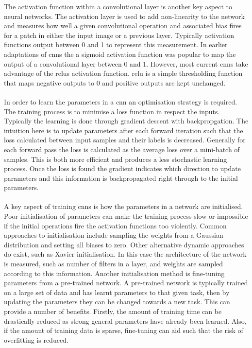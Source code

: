 The activation function within a convolutional layer is another key aspect to neural networks. The activation layer is used to add non-linearity to the network and measures how well a given convolutional operation and associated bias fires for a patch in either the input image or a previous layer. Typically activation functions output between 0 and 1 to represent this measurement. In earlier adaptations of \glspl{cnn} the a sigmoid activation function was popular to map the output of a convolutional layer between 0 and 1. However, most current \glspl{cnn} take advantage of the \glspl{relu} activation function. \gls{relu} is a simple thresholding function that maps negative outputs to 0 and positive outputs are kept unchanged.
\\\\
In order to learn the parameters in a \gls{cnn} an optimisation strategy is required. The training process is to minimise a loss function in respect the inputs. Typically the learning is done through gradient descent with backpropgation. The intuition here is to update parameters after each forward iteration such that the loss calculated between input samples and their labels is decreased. Generally for each forward pass the loss is calculated as the average loss over a mini-batch of samples. This is both more efficient and produces a less stochastic learning process. Once the loss is found the gradient indicates which direction to update parameters and this information is backpropagated right through to the initial parameters.
\\\\
A key aspect of training \glspl{cnn} is how the parameters in a network are initialised. Poor initialisation of parameters can make the training process slow or impossible if the initial operations fire the activation functions too violently. Common approaches to initialisation include sampling the weights from a Gaussian distribution and setting all biases to zero. Other alternative dynamic approaches do exist, such as Xavier initialisation. In this case the architecture of the network is measured, such as number of filters in a layer, and weights are sampled according to this information. Another initialisation method is fine-tuning parameters from a pre-trained network. A pre-trained network is typically trained on a large set of data and has learnt parameters to that given task, then by updating the parameters they can be changed towards a new task. This can provide a number of benefits. Firstly, the amount of training time can be drastically reduced as strong general parameters have already been learned. Also, if the amount of training data is sparse, fine-tuning can aid such that the risk of overfitting is reduced.

